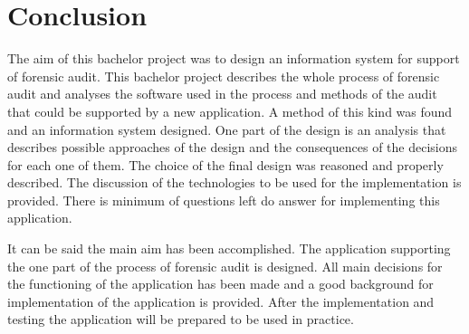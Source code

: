 \chapter*{Conclusion} \label{Conclusion}

The aim of this bachelor project was to design an information system for support of forensic audit. 
This bachelor project describes the whole process of forensic audit and analyses the software used in the 
process and methods of the audit that could be supported by a new application. A method of this kind 
was found and an information system designed. One part of the design is an analysis that describes 
possible approaches of the design and the consequences of the decisions for each one of them. The choice 
of the final design was reasoned and properly described. The discussion of the technologies to be used 
for the implementation is provided. There is minimum of questions left do answer for 
implementing this application. 



It can be said the main aim has been accomplished. The application supporting 
the one part of the process of forensic audit is designed. All main decisions for the functioning of 
the application has been made and a good background for implementation of the application is provided. 
After the implementation and testing the application will be prepared to be used in practice. 



%
